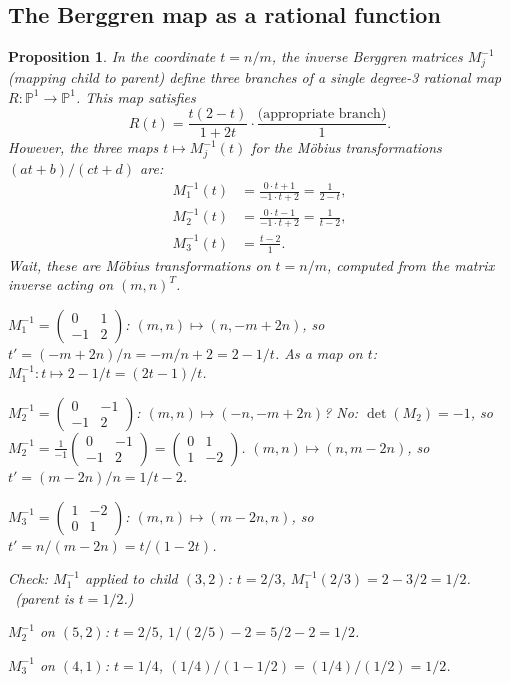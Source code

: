 \documentclass[12pt]{amsart}
\newtheorem{proposition}[theorem]{Proposition}
\theoremstyle{definition}
\theoremstyle{remark}
\newcommand{\PP}{\mathbb{P}}
\begin{document}
\subsection{The Berggren map as a rational function}

\begin{proposition}\label{prop:rational-map}
In the coordinate $t = n/m$, the inverse Berggren matrices $M_j^{-1}$
(mapping child to parent) define three branches of a single degree-3
rational map $R\colon\PP^1\to\PP^1$.  This map satisfies
\begin{equation}\label{eq:R-def}
  R(t) = \frac{t(2-t)}{1+2t} \cdot \frac{\text{(appropriate branch)}}{1}.
\end{equation}
However, the three maps $t\mapsto M_j^{-1}(t)$ for the M\"obius
transformations $(at+b)/(ct+d)$ are:
\begin{align*}
  M_1^{-1}(t) &= \frac{0\cdot t + 1}{-1\cdot t + 2} = \frac{1}{2-t}, \\
  M_2^{-1}(t) &= \frac{0\cdot t - 1}{-1\cdot t + 2} = \frac{1}{t-2}, \\
  M_3^{-1}(t) &= \frac{t-2}{1}.
\end{align*}
Wait, these are M\"obius transformations on $t=n/m$, computed from
the matrix inverse acting on $(m,n)^T$.

$M_1^{-1} = \left(\begin{smallmatrix}0&1\\-1&2\end{smallmatrix}\right)$:
$(m,n)\mapsto(n, -m+2n)$, so $t' = (-m+2n)/n = -m/n+2 = 2-1/t$.
As a map on $t$: $M_1^{-1}: t\mapsto 2-1/t = (2t-1)/t$.

$M_2^{-1} = \left(\begin{smallmatrix}0&-1\\-1&2\end{smallmatrix}\right)$:
$(m,n)\mapsto(-n, -m+2n)$?  No: $\det(M_2)=-1$, so
$M_2^{-1} = \frac{1}{-1}\left(\begin{smallmatrix}0&-1\\-1&2\end{smallmatrix}\right)
= \left(\begin{smallmatrix}0&1\\1&-2\end{smallmatrix}\right)$.
$(m,n)\mapsto(n, m-2n)$, so $t' = (m-2n)/n = 1/t - 2$.

$M_3^{-1} = \left(\begin{smallmatrix}1&-2\\0&1\end{smallmatrix}\right)$:
$(m,n)\mapsto(m-2n, n)$, so $t' = n/(m-2n) = t/(1-2t)$.

Check: $M_1^{-1}$ applied to child $(3,2)$: $t=2/3$,
$M_1^{-1}(2/3) = 2-3/2 = 1/2$. \checkmark\ (parent is $t=1/2$.)

$M_2^{-1}$ on $(5,2)$: $t=2/5$, $1/(2/5)-2 = 5/2-2 = 1/2$. \checkmark

$M_3^{-1}$ on $(4,1)$: $t=1/4$, $(1/4)/(1-1/2) = (1/4)/(1/2) = 1/2$.
\checkmark
\end{proposition}
\end{document}
